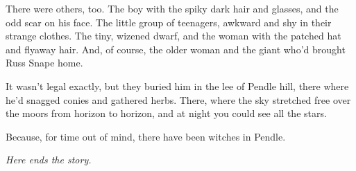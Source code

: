 There were others, too. The boy with the spiky dark hair and glasses, and the odd scar on his face. The little group of teenagers, awkward and shy in their strange clothes. The tiny, wizened dwarf, and the woman with the patched hat and flyaway hair. And, of course, the older woman and the giant who'd brought Russ Snape home.

It wasn't legal exactly, but they buried him in the lee of Pendle hill, there where he'd snagged conies and gathered herbs. There, where the sky stretched free over the moors from horizon to horizon, and at night you could see all the stars.

Because, for time out of mind, there have been witches in Pendle.

\sbreak

\begin{center}\emph{Here ends the story.}\end{center}
